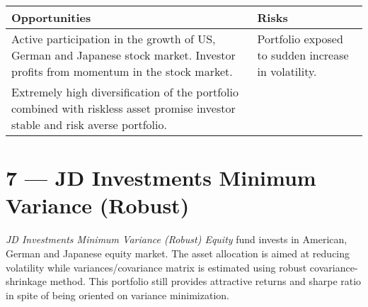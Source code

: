 \documentclass{scrreprt}
\begin{document}
\begin{table}[H]
\begin{tabularx}{\textwidth}{XX}
  \toprule
  \textbf{\textsf{Opportunities}} & \textbf{\textsf{Risks}} \\
  \midrule
Active participation in the growth of US, German and Japanese stock market. Investor profits from momentum in the stock market. &
Portfolio exposed to sudden increase in volatility. \\[1em]
Extremely high diversification of the portfolio combined with riskless asset promise investor stable and risk averse portfolio. &\\
  \bottomrule
\end{tabularx}
\end{table}

\newpage\section*{7 --- JD Investments Minimum Variance (Robust)}

\textit{JD Investments Minimum Variance (Robust) Equity} fund invests in American, German and Japanese equity market. The asset allocation is aimed at reducing volatility while variances/covariance matrix is estimated using robust covariance-shrinkage method. This portfolio still provides attractive returns and sharpe ratio in spite of being oriented on variance minimization.

\begin{figure}[H]
\end{figure}
\end{document}
